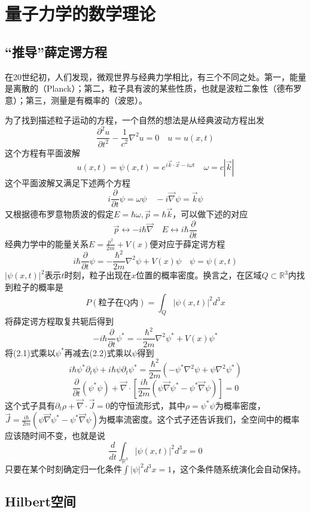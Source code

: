 \section{量子力学的数学理论}
\subsection{“推导”薛定谔方程}
在20世纪初，人们发现，微观世界与经典力学相比，有三个不同之处。第一，能量是离散的（Planck）；第二，粒子具有波的某些性质，也就是波粒二象性（德布罗意）；第三，测量是有概率的（波恩）。

为了找到描述粒子运动的方程，一个自然的想法是从经典波动方程出发
$$\frac{\partial ^2u}{\partial t^2}-\frac{1}{c^2}\nabla^2 u=0\quad u=u(x,t)$$
这个方程有平面波解
$$u(x,t)=\psi(x,t)=e^{i\vec{k}\cdot\vec{x}-i\omega t}\quad \omega=c|\vec{k}|$$
这个平面波解又满足下述两个方程
$$i\frac{\partial}{\partial t}\psi=\omega\psi\quad -i\vec{\nabla}\psi=\vec{k}\psi$$
又根据德布罗意物质波的假定$E=\hbar\omega,\vec{p}=\hbar\vec{k}$，可以做下述的对应
$$\vec{p}\leftrightarrow -i\hbar\vec{\nabla}\quad E\leftrightarrow i\hbar\frac{\partial}{\partial t}$$
经典力学中的能量关系$E=\frac{p^2}{2m}+V(x)$便对应于薛定谔方程
\begin{equation}
    i\hbar\frac{\partial}{\partial t}\psi=-\frac{\hbar^2}{2m}\nabla^2\psi+V(x)\psi\quad\psi=\psi(x,t)
\end{equation}
$|\psi(x,t)|^2$表示$t$时刻，粒子出现在$x$位置的概率密度。换言之，在区域$Q\subset\mathbb{R}^3$内找到粒子的概率是
$$P(\text{粒子在Q内})=\int_Q|\psi(x,t)|^2d^3x$$
将薛定谔方程取复共轭后得到
\begin{equation}
    -i\hbar\frac{\partial}{\partial t}\psi^*=-\frac{\hbar^2}{2m}\nabla^2\psi^*+V(x)\psi^*
\end{equation}
将(2.1)式乘以$\psi^*$再减去(2.2)式乘以$\psi$得到
$$i\hbar\psi^*\partial_t\psi+i\hbar\psi\partial_t\psi^*=\frac{\hbar^2}{2m}(-\psi^*\nabla^2\psi+\psi\nabla^2\psi^*)$$
$$\frac{\partial}{\partial t}(\psi^*\psi)+\vec{\nabla}\cdot\left[\frac{i\hbar}{2m}(\psi\vec{\nabla}\psi^*-\psi^*\vec{\nabla}\psi)\right]=0$$
这个式子具有$\partial_t\rho+\vec{\nabla}\cdot\vec{J}=0$的守恒流形式，其中$\rho=\psi^*\psi$为概率密度，$\vec{J}=\frac{i\hbar}{2m}(\psi\vec{\nabla}\psi^*-\psi^*\vec{\nabla}\psi)$为概率流密度。这个式子还告诉我们，全空间中的概率应该随时间不变，也就是说
$$\frac{d}{dt}\int_{\mathbb{R}^3}|\psi(x,t)|^2d^3x=0$$
只要在某个时刻确定归一化条件$\int|\psi|^2d^3x=1$，这个条件随系统演化会自动保持。
\subsection{Hilbert空间}
